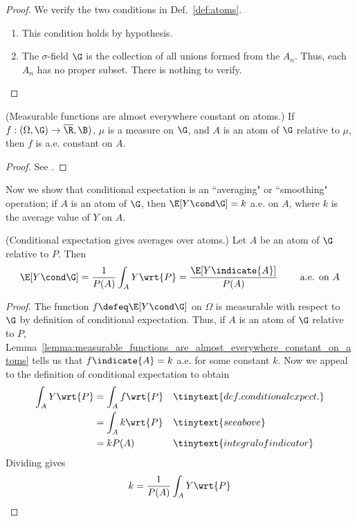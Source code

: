 \documentclass{article} %
\begin{document}
\begin{proof} We verify the two conditions in Def.~\ref{def:atoms}.
\begin{enumerate}
	\item This condition holds by hypothesis. 
	\item The $\sigma$-field $\G$ is the collection of all unions formed from the $A_n$.  Thus, each $A_n$ has no proper subset.  There is nothing to verify. 
\end{enumerate} 
\end{proof}

\begin{lemma}\textnormal{(Measurable functions are almost everywhere constant on atoms.)}
If $f: (\Omega, \G) \to \overline{\R}, \B)$, $\mu$ is a measure on $\G$, and $A$ is an atom of $\G$ relative to $\mu$, then $f$ is a.e. constant on $A$.
\label{lemma:measurable_functions_are_almost_everywhere_constant_on_atoms}
\end{lemma}

\begin{proof}
See \cite[Lemma 5.5.8, pp. 225]{ash2000probability}.	
\end{proof}

Now we show that conditional expectation is an ``averaging" or ``smoothing" operation; if $A$ is an atom of $\G$, then $ \E[Y \cond \G]  = k$ a.e. on $A$, where $k$ is the average value of $Y$ on $A$.
\begin{theorem}
\textnormal{(Conditional expectation gives averages over atoms.)}
Let $A$ be an atom of $\G$ relative to $P$. Then 
\[ \E[Y \cond \G] = \frac{1}{P(A)} \int_A Y \wrt{P} = \frac{\E[Y \indicate{A}]}{P(A)}   \quad \quad \text{ a.e. on } A \]	
\label{thm:conditional_expectation_as_average_over_atoms}
\end{theorem}

\begin{proof}
The function $f \defeq \E[Y \cond \G]$ on $\Omega$ is measurable with respect to $\G$ by definition of conditional expectation.  Thus, if $A$ is an atom of $\G$ relative to $P$, Lemma~\ref{lemma:measurable_functions_are_almost_everywhere_constant_on_atoms} tells us that $f \indicate{A} = k$ a.e. for some constant $k$.  Now we appeal to the definition of conditional expectation to obtain
%
\begin{align*}
\int_A Y \wrt{P} &= \int_A f \wrt{P}	&& \tinytext{def. conditional expect.} \\
&= \int_A k \wrt{P} && \tinytext{see above} \\
&= k P(A) && \tinytext{integral of indicator}
\end{align*}
Dividing gives
\[ k=\frac{1}{P(A)} \int_A Y \wrt{P}\]
\end{proof}
\end{document}
